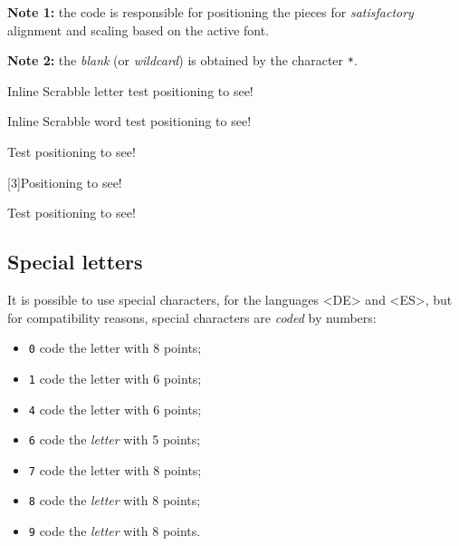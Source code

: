 \documentclass{article}
\begin{document}
\textbf{Note 1:} the code is responsible for positioning the pieces for \textit{satisfactory} alignment and scaling based on the active font.

\smallskip

\textbf{Note 2:} the \textit{blank} (or \textit{wildcard}) is obtained by the character \texttt{*}.

\begin{PresentationCode}{}
Inline Scrabble letter test positioning  to see!
\end{PresentationCode}

\begin{PresentationCode}{}
Inline Scrabble word test positioning  to see!
\end{PresentationCode}

\begin{PresentationCode}{}
{\Huge\sffamily Test positioning  to see!}
\end{PresentationCode}

\begin{PresentationCode}{}
\scalebox{3}[3]{Positioning  to see!}
\end{PresentationCode}

\begin{PresentationCode}{}
{\LARGE Test positioning  to see!}
\end{PresentationCode}

\newpage

\subsection{Special letters}

It is possible to use special characters, for the languages \textsf{<DE>} and \textsf{<ES>}, but for compatibility reasons, special characters are \textit{coded} by numbers:

\begin{itemize}
	\item \texttt{0} code the letter  with 8 points;
	\item \texttt{1} code the letter  with 6 points;
	\item \texttt{4} code the letter  with 6 points;
	\item \texttt{6} code the \textit{letter}  with 5 points;
	\item \texttt{7} code the letter  with 8 points;
	\item \texttt{8} code the \textit{letter}  with 8 points;
	\item \texttt{9} code the \textit{letter}  with 8 points.
\end{itemize}
\end{document}
